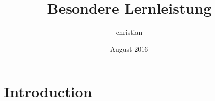 \documentclass{article}
\title{Besondere Lernleistung}
\author{christian }
\date{August 2016}
\begin{document}
\maketitle

\section{Introduction}
\end{document}
